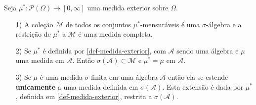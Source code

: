 \begin{teorema}
\label{teorema-caratheodory}
Seja $\mu^*:\mathcal{P}(\Omega)\to [0,\infty]$ uma medida exterior sobre $\Omega$.
\begin{itemize}
	\item[1)] A coleção $\mathcal{M}$ de todos os conjuntos $\mu^*$-mensuráveis
				é uma $\sigma$-álgebra e a restrição de $\mu^*$ a $\mathcal{M}$
				é uma medida completa.
	\item[2)] Se $\mu^*$ é definida por \eqref{def-medida-exterior}, com $\mathcal{A}$
				sendo uma álgebra e $\mu$ uma medida em $\mathcal{A}$. Então 
				$\sigma(\mathcal{A})\subset \mathcal{M}$ e $\mu^*=\mu$ em $\mathcal{A}$.
	\item[3)] Se $\mu$ é uma medida $\sigma$-finita em uma álgebra $\mathcal{A}$ 
				então ela se estende {\bf unicamente}
				 a uma medida definida em $\sigma(\mathcal{A})$. Esta extensão 
				 é dada por $\mu^*$, definida em \eqref{def-medida-exterior}, restrita
				 a $\sigma(\mathcal{A})$.
\end{itemize}
\end{teorema}


